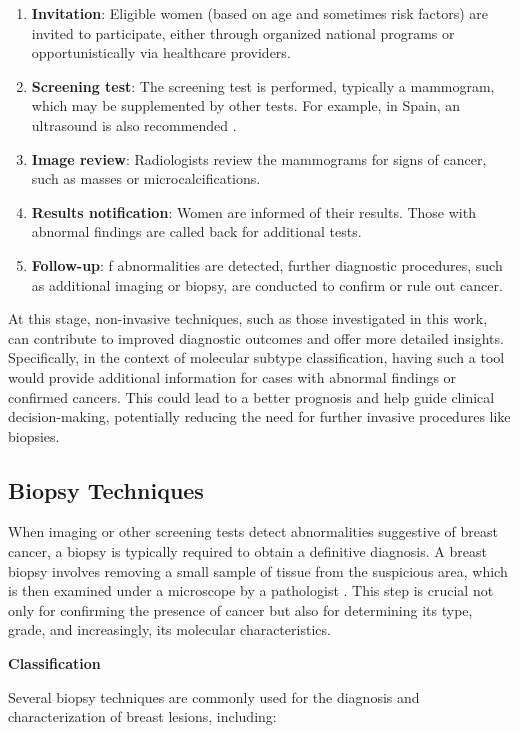 \documentclass[a4paper,10pt]{book}
\begin{document}
\begin{enumerate}
    \item \textbf{Invitation}: Eligible women (based on age and sometimes risk factors) are invited to participate, either through organized national programs or opportunistically via healthcare providers.
    \item \textbf{Screening test}: The screening test is performed, typically a mammogram, which may be supplemented by other tests. For example, in Spain, an ultrasound is also recommended \cite{noauthor_map_nodate}.
    \item \textbf{Image review}: Radiologists review the mammograms for signs of cancer, such as masses or microcalcifications.
    \item \textbf{Results notification}: Women are informed of their results. Those with abnormal findings are called back for additional tests.
    \item \textbf{Follow-up}: f abnormalities are detected, further diagnostic procedures, such as additional imaging or biopsy, are conducted to confirm or rule out cancer.
\end{enumerate}


At this stage, non-invasive techniques, such as those investigated in this work, can contribute to improved diagnostic outcomes and offer more detailed insights. Specifically, in the context of molecular subtype classification, having such a tool would provide additional information for cases with abnormal findings or confirmed cancers. This could lead to a better prognosis and help guide clinical decision-making, potentially reducing the need for further invasive procedures like biopsies.

\subsection{Biopsy Techniques}

When imaging or other screening tests detect abnormalities suggestive of breast cancer, a biopsy is typically required to obtain a definitive diagnosis. A breast biopsy involves removing a small sample of tissue from the suspicious area, which is then examined under a microscope by a pathologist \cite{DefinitionBiopsyNCI2011}. This step is crucial not only for confirming the presence of cancer but also for determining its type, grade, and increasingly, its molecular characteristics.

\textbf{Classification}

Several biopsy techniques are commonly used for the diagnosis and characterization of breast lesions, including:
\end{document}
